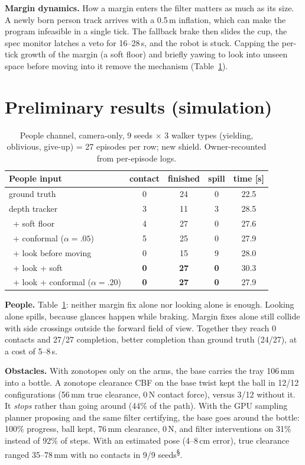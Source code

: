 \documentclass[10pt,twocolumn,letterpaper]{article}
\newcommand{\pre}{\textsuperscript{\S}}   %
\begin{document}
\textbf{Margin dynamics.} How a margin enters the filter matters as much as its size. A newly born person track arrives with a 0.5\,m
inflation, which can make the program infeasible in a single tick. The fallback brake then slides the cup, the spec monitor latches a veto
for 16--28\,s, and the robot is stuck. Capping the per-tick growth of the margin (a soft floor) and briefly yawing to look into unseen space
before moving into it remove the mechanism (Table~\ref{tab:people}).

\section{Preliminary results (simulation)}\label{sec:results}
\begin{table}[t]
\centering\small
\caption{People channel, camera-only, 9 seeds $\times$ 3 walker types (yielding, oblivious, give-up) = 27 episodes per row; new shield.
Owner-recounted from per-episode logs.}
\label{tab:people}
\begin{tabular}{@{}lcccc@{}}
\toprule
People input & contact & finished & spill & time [s]\\
\midrule
ground truth & 0 & 24 & 0 & 22.5\\
depth tracker & 3 & 11 & 3 & 28.5\\
\ + soft floor & 4 & 27 & 0 & 27.6\\
\ + conformal ($\alpha{=}.05$) & 5 & 25 & 0 & 27.9\\
\ + look before moving & 0 & 15 & 9 & 28.0\\
\ + look + soft & \textbf{0} & \textbf{27} & \textbf{0} & 30.3\\
\ + look + conformal ($\alpha{=}.20$) & \textbf{0} & \textbf{27} & \textbf{0} & 27.9\\
\bottomrule
\end{tabular}
\vspace{-1mm}
\end{table}

\textbf{People.} Table~\ref{tab:people}: neither margin fix alone nor looking alone is enough. Looking alone spills, because glances
happen while braking. Margin fixes alone still collide with side crossings outside the forward field of view. Together they reach
0 contacts and 27/27 completion, better completion than ground truth (24/27), at a cost of 5--8\,s.

\textbf{Obstacles.} With zonotopes only on the arms, the base carries the tray 106\,mm into a bottle. A zonotope clearance CBF on the base
twist kept the ball in 12/12 configurations (56\,mm true clearance, 0\,N contact force), versus 3/12 without it. It \emph{stops} rather than
going around (44\% of the path). With the GPU sampling planner proposing and the same filter certifying, the base goes around the bottle: 100\% progress, ball kept, 76\,mm clearance, 0\,N, and filter interventions on 31\% instead of 92\% of steps. With an estimated pose (4--8\,cm error), true clearance
ranged 35--78\,mm with no contacts in 9/9 seeds\pre.
\end{document}

